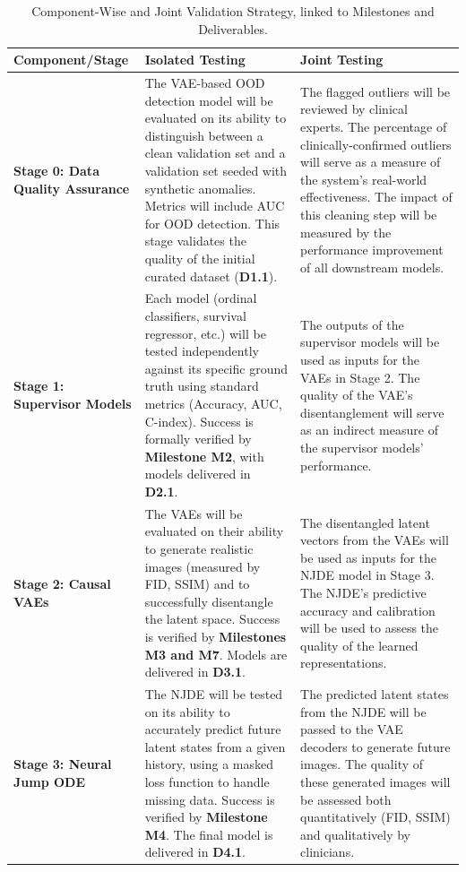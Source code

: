 \documentclass[11pt, a4paper]{article}
\begin{document}
\begin{table}[H]
    \centering
    \caption{Component-Wise and Joint Validation Strategy, linked to Milestones and Deliverables.}
    \label{tab:validation_strategy}
    \small
    \begin{tabular}{p{} p{} p{}}
        \toprule
        \textbf{Component/Stage} & \textbf{Isolated Testing} & \textbf{Joint Testing} \\
        \midrule
        \textbf{Stage 0: Data Quality Assurance} & The VAE-based OOD detection model will be evaluated on its ability to distinguish between a clean validation set and a validation set seeded with synthetic anomalies. Metrics will include AUC for OOD detection. This stage validates the quality of the initial curated dataset (\textbf{D1.1}). & The flagged outliers will be reviewed by clinical experts. The percentage of clinically-confirmed outliers will serve as a measure of the system's real-world effectiveness. The impact of this cleaning step will be measured by the performance improvement of all downstream models. \\
        \addlinespace
        \textbf{Stage 1: Supervisor Models} & Each model (ordinal classifiers, survival regressor, etc.) will be tested independently against its specific ground truth using standard metrics (Accuracy, AUC, C-index). Success is formally verified by \textbf{Milestone M2}, with models delivered in \textbf{D2.1}. & The outputs of the supervisor models will be used as inputs for the VAEs in Stage 2. The quality of the VAE's disentanglement will serve as an indirect measure of the supervisor models' performance. \\
        \addlinespace
        \textbf{Stage 2: Causal VAEs} & The VAEs will be evaluated on their ability to generate realistic images (measured by FID, SSIM) and to successfully disentangle the latent space. Success is verified by \textbf{Milestones M3 and M7}. Models are delivered in \textbf{D3.1}. & The disentangled latent vectors from the VAEs will be used as inputs for the NJDE model in Stage 3. The NJDE's predictive accuracy and calibration will be used to assess the quality of the learned representations. \\
        \addlinespace
        \textbf{Stage 3: Neural Jump ODE} & The NJDE will be tested on its ability to accurately predict future latent states from a given history, using a masked loss function to handle missing data. Success is verified by \textbf{Milestone M4}. The final model is delivered in \textbf{D4.1}. & The predicted latent states from the NJDE will be passed to the VAE decoders to generate future images. The quality of these generated images will be assessed both quantitatively (FID, SSIM) and qualitatively by clinicians. \\

\end{tabular}
\end{table}
\end{document}
